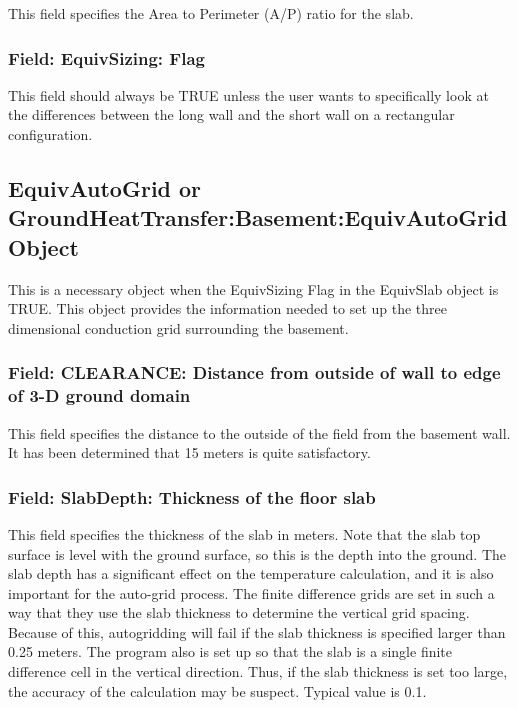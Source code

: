 This field specifies the Area to Perimeter (A/P) ratio for the slab.

\subsubsection{Field: EquivSizing: Flag}\label{field-equivsizing-flag}

This field should always be TRUE unless the user wants to specifically look at the differences between the long wall and the short wall on a rectangular configuration.

\subsection{EquivAutoGrid or GroundHeatTransfer:Basement:EquivAutoGrid Object}\label{equivautogrid-or-groundheattransferbasementequivautogrid-object}

This is a necessary object when the EquivSizing Flag in the EquivSlab object is TRUE. This object provides the information needed to set up the three dimensional conduction grid surrounding the basement.

\subsubsection{Field: CLEARANCE: Distance from outside of wall to edge of 3-D ground domain}\label{field-clearance-distance-from-outside-of-wall-to-edge-of-3-d-ground-domain}

This field specifies the distance to the outside of the field from the basement wall. It has been determined that 15 meters is quite satisfactory.

\subsubsection{Field: SlabDepth: Thickness of the floor slab}\label{field-slabdepth-thickness-of-the-floor-slab}

This field specifies the thickness of the slab in meters. Note that the slab top surface is level with the ground surface, so this is the depth into the ground. The slab depth has a significant effect on the temperature calculation, and it is also important for the auto-grid process. The finite difference grids are set in such a way that they use the slab thickness to determine the vertical grid spacing. Because of this, autogridding will fail if the slab thickness is specified larger than 0.25 meters. The program also is set up so that the slab is a single finite difference cell in the vertical direction. Thus, if the slab thickness is set too large, the accuracy of the calculation may be suspect. Typical value is 0.1.


